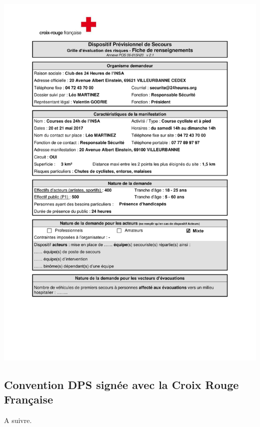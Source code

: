 \documentclass[hidelinks, paper=a4, fontsize=13pt]{report}
\begin{document}
\begin{center}
	\includegraphics[scale=0.70, page=2]{Annexes/Documents/Fiche_RIS_Courses_2017}
\end{center}

\subsection{Convention DPS signée avec la Croix Rouge Française}
A suivre.
\end{document}
